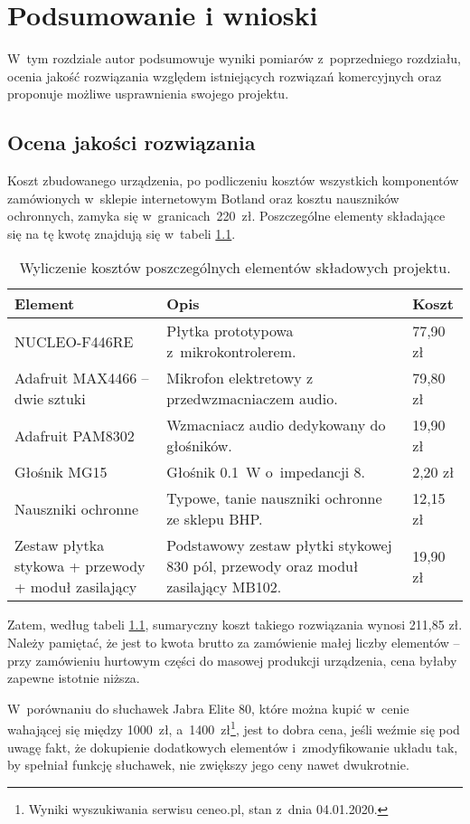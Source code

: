 \chapter{Podsumowanie i wnioski}
\label{cha:wnioski}
W~tym rozdziale autor podsumowuje wyniki pomiarów z~poprzedniego rozdziału, ocenia jakość rozwiązania względem istniejących rozwiązań komercyjnych oraz proponuje możliwe usprawnienia swojego projektu.
\section{Ocena jakości rozwiązania}
Koszt zbudowanego urządzenia, po podliczeniu kosztów wszystkich komponentów zamówionych w~sklepie internetowym Botland oraz kosztu nauszników ochronnych, zamyka się w~granicach~220~zł. Poszczególne elementy składające się na tę kwotę znajdują się w~tabeli \ref{tab:costs}.
\begin{table}[h!]
	\centering
	\caption{Wyliczenie kosztów poszczególnych elementów składowych projektu.}
	\label{tab:costs}
		\begin{tabular}{|p{} | p{} | p{}|}
		\hline 
		Element & Opis & Koszt \\ 
		\hline\hline
		NUCLEO-F446RE & Płytka prototypowa z~mikrokontrolerem. & 77,90 zł \\ 
		\hline
		Adafruit MAX4466 -- dwie sztuki & Mikrofon elektretowy z przedwzmacniaczem audio. & 79,80 zł \\
		\hline
		Adafruit PAM8302 & Wzmacniacz audio dedykowany do głośników. & 19,90 zł \\
		\hline
		Głośnik MG15 & Głośnik \SI{0,1}{\W} o~impedancji \SI{8}{\Omega}. & 2,20 zł \\
		\hline
		Nauszniki ochronne & Typowe, tanie nauszniki ochronne ze sklepu BHP. & 12,15 zł \\
		\hline
		Zestaw płytka stykowa + przewody + moduł zasilający & Podstawowy zestaw płytki stykowej 830 pól, przewody oraz moduł zasilający MB102. & 19,90 zł \\
		\hline
	\end{tabular}
\end{table}

Zatem, według tabeli \ref{tab:costs}, sumaryczny koszt takiego rozwiązania wynosi 211,85 zł. Należy pamiętać, że jest to kwota brutto za zamówienie małej liczby elementów -- przy zamówieniu hurtowym części do masowej produkcji urządzenia, cena byłaby zapewne istotnie niższa.

W~porównaniu do słuchawek Jabra Elite 80, które można kupić w~cenie wahającej się między 1000~zł, a~1400~zł\footnote{Wyniki wyszukiwania serwisu ceneo.pl, stan z~dnia 04.01.2020.}, jest to dobra cena, jeśli weźmie się pod uwagę fakt, że dokupienie dodatkowych elementów i~zmodyfikowanie układu tak, by spełniał funkcję słuchawek, nie zwiększy jego ceny nawet dwukrotnie.

